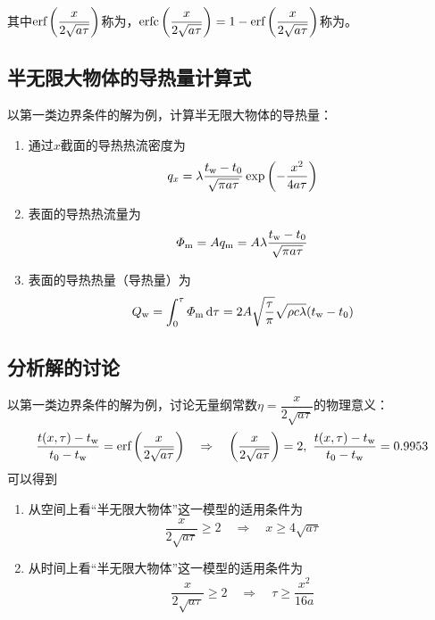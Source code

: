 其中$\text{erf}\left(\dfrac{x}{2\sqrt{a \tau}}\right)$称为，$\text{erfc}\left(\dfrac{x}{2 \sqrt{a \tau}}\right) = 1 - \text{erf}\left(\dfrac{x}{2\sqrt{a \tau}}\right)$称为。
\vspace{1em}

\subsection{半无限大物体的导热量计算式}
\noindent 以第一类边界条件的解为例，计算半无限大物体的导热量：
\begin{enumerate}[\hspace*{2em} (1) ]
	\item 通过$x$截面的导热热流密度为
	\begin{equation}
		q_x = \lambda \dfrac{t_{\text{w}} - t_0}{\sqrt{\pi a \tau}} \exp \left( - \dfrac{x^2}{4 a \tau}\right)
	\end{equation}

	\item 表面的导热热流量为
	\begin{equation}
		\varPhi_{\text{m}} = Aq_{\text{m}} = A \lambda \dfrac{t_{\text{w}} - t_0}{\sqrt{\pi a \tau}}
	\end{equation}

	\item 表面的导热热量（导热量）为
	\begin{equation}
		Q_{\text{w}} = \int_0^\tau \varPhi_{\text{m}} \, {\rm{d}} \tau = 2A\sqrt{\dfrac{\tau}{\pi}}\sqrt{\rho c \lambda}(t_{\text{w}} - t_0)
	\end{equation}
	
\end{enumerate}



\subsection{分析解的讨论}
以第一类边界条件的解为例，讨论无量纲常数$\eta = \dfrac{x}{2\sqrt{a \tau}}$的物理意义：
\begin{equation}
	\dfrac{t(x, \tau)-t_{\text{w}}}{t_0 - t_{\text{w}}} = \text{erf} \left(\dfrac{x}{2\sqrt{a\tau}}\right) \quad \Rightarrow \quad 
	\left(\dfrac{x}{2\sqrt{a \tau}}\right)= 2, \,\, \dfrac{t(x, \tau)-t_{\text{w}}}{t_0 - t_{\text{w}}} = 0.9953
\end{equation}
可以得到
\begin{enumerate}[\hspace*{2em} (1) ]
	\item 从空间上看“半无限大物体”这一模型的适用条件为
	\begin{equation}
		\dfrac{x}{2 \sqrt{a \tau}} \ge 2 \quad \Rightarrow \quad x \ge 4\sqrt{a \tau}
	\end{equation}

	\item 从时间上看“半无限大物体”这一模型的适用条件为
	\begin{equation}
		\dfrac{x}{2 \sqrt{a \tau}} \ge 2 \quad \Rightarrow \quad \tau \ge \dfrac{x^2}{16a}
	\end{equation}
\end{enumerate}


